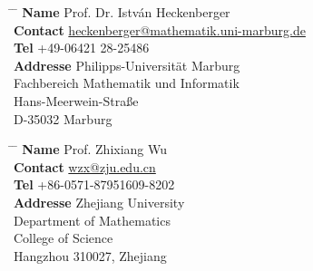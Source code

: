 \documentclass[10pt]{article} %
\begin{document}
\parbox{0.1\textwidth}{ %
\begin{tabbing}
\hspace{2cm} \= \hspace{4cm} \= \kill %
{\bf Name} \> Prof. Dr. István Heckenberger \\ %
{\bf Contact} \> \href{mailto:heckenberger@mathematik.uni-marburg.de}{heckenberger@mathematik.uni-marburg.de}\\ %
{\bf Tel} \> +49-06421 28-25486 \\ %
{\bf Addresse} \> Philipps-Universität Marburg \\ %
{\bf } \> Fachbereich Mathematik und Informatik \\ %
{\bf } \> Hans-Meerwein-Straße \\
{\bf } \> D-35032 Marburg\\

\end{tabbing}}
\hfill %
\parbox{0.4\textwidth}{ %
\begin{tabbing}
\hspace{2cm} \= \hspace{4cm} \= \kill %
{\bf Name} \> Prof. Zhixiang Wu\\ %
{\bf Contact} \> \href{mailto:wzx@zju.edu.cn}{wzx@zju.edu.cn} \\ %
{\bf Tel} \> +86-0571-87951609-8202 \\ %
{\bf Addresse} \>  Zhejiang University\\ %
{\bf } \> Department of Mathematics\\ %
{\bf } \> College of Science \\
{\bf } \> Hangzhou 310027, Zhejiang\\
\end{tabbing}}

\end{document}

